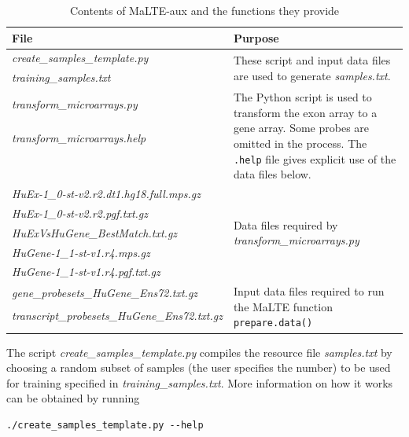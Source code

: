 \documentclass[a4paper,12pt]{article}
\begin{document}
\begin{table}
\centering
\begin{tabular}{|l|p{6cm}|}
\hline
\textbf{File} & \textbf{Purpose} \\
\hline
\textit{create\_samples\_template.py} & \multirow{2}{*}{\parbox{6cm}{These script and input data files are used to generate \textit{samples.txt}.}} \\
\textit{training\_samples.txt} & \\
\hline
\textit{transform\_microarrays.py} & \multirow{6}{*}{\parbox{6cm}{The \textsf{Python} script is used to transform the exon array to a gene array. Some probes are omitted in the process. The \texttt{.help} file gives explicit use of the data files below.}} \\
\textit{transform\_microarrays.help} & \\
 & \\
 & \\
 & \\
 & \\
\hline

\textit{HuEx-1\_0-st-v2.r2.dt1.hg18.full.mps.gz} & \multirow{5}{*}{\parbox{6cm}{Data files required by \textit{transform\_microarrays.py}}} \\
\textit{HuEx-1\_0-st-v2.r2.pgf.txt.gz} & \\
\textit{HuExVsHuGene\_BestMatch.txt.gz} & \\
\textit{HuGene-1\_1-st-v1.r4.mps.gz} & \\
\textit{HuGene-1\_1-st-v1.r4.pgf.txt.gz} & \\
\hline
\textit{gene\_probesets\_HuGene\_Ens72.txt.gz} & \multirow{3}{*}{\parbox{6cm}{Input data files required to run the \textsf{MaLTE} function \texttt{prepare.data()}}} \\ \textit{transcript\_probesets\_HuGene\_Ens72.txt.gz} & \\
 & \\
\hline
\end{tabular}
\caption{Contents of MaLTE-aux and the functions they provide}
\label{tab:malte_aux}
\end{table}

The script \textit{create\_samples\_template.py} compiles the resource file \textit{samples.txt} by choosing a random subset of samples (the user specifies the number) to be used for training specified in \textit{training\_samples.txt}. More information on how it works can be obtained by running 

\begin{verbatim}
./create_samples_template.py --help
\end{verbatim}
\end{document}
